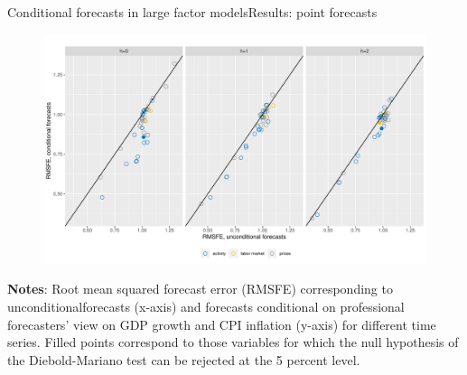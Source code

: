 \documentclass[xcolor=svgnames, 10pt, aspectratio=169]{beamer}
\begin{document}
\begin{frame}{Conditional forecasts in large factor models}{Results: point forecasts}
    \begin{figure}
        \includegraphics[scale = 0.4]{fig_eval_rmsfe.pdf}  \vspace{0.1cm} \\
    \end{figure}

    \begin{adjustbox}{minipage=0.8\textwidth,center}
        {\tiny \textbf{Notes}: Root mean squared forecast error (RMSFE) corresponding to unconditionalforecasts (x-axis) and forecasts conditional on professional forecasters’ view on GDP growth and CPI inflation (y-axis) for different time series. Filled points correspond to those variables for which the null hypothesis of the Diebold-Mariano test can be rejected at the 5 percent level.}\par
\end{adjustbox} 
\end{frame}
\end{document}
